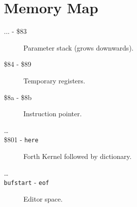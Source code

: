 \chapter{Memory Map}

\begin{description}
\item[... - \$83] Parameter stack (grows downwards).
\item[\$84 - \$89] Temporary registers.
\item[\$8a - \$8b] Instruction pointer.
\item[\ldots]
\item[\$801 - \texttt{here}] Forth Kernel followed by dictionary.
\item[\ldots]
\item[\texttt{bufstart} - \texttt{eof}] Editor space.
\end{description}


